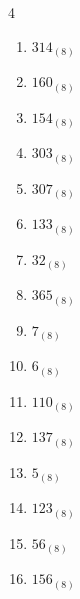 \begin{multicols}{4}
\begin{enumerate}
  \item $314_{(8)}$

        \phantom{$=204$}

  \item $160_{(8)}$

        \phantom{$=112$}

  \item $154_{(8)}$

        \phantom{$=108$}

  \item $303_{(8)}$

        \phantom{$=195$}

  \item $307_{(8)}$

        \phantom{$=199$}

\columnbreak %

  \item $133_{(8)}$

        \phantom{$=91$}

  \item $32_{(8)}$

        \phantom{$=26$}

  \item $365_{(8)}$

        \phantom{$=245$}

  \item $7_{(8)}$

        \phantom{$=7$}

  \item $6_{(8)}$

        \phantom{$=6$}

  \item $110_{(8)}$

        \phantom{$=72$}

  \item $137_{(8)}$

        \phantom{$=95$}

  \item $5_{(8)}$

        \phantom{$=5$}

  \item $123_{(8)}$

        \phantom{$=83$}

  \item $56_{(8)}$

        \phantom{$=46$}

  \item $156_{(8)}$


\end{enumerate}
\end{multicols}
